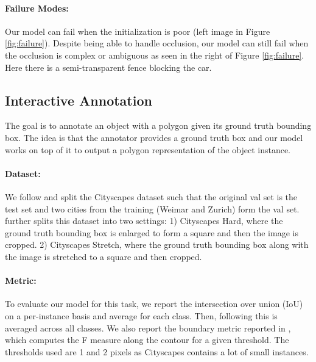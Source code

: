 \documentclass[10pt,twocolumn,letterpaper]{article}
\begin{document}
\paragraph{Failure Modes:} 
Our model can  fail when the initialization is poor (left image in Figure \ref{fig:failure}). Despite being able to handle occlusion, our model can still fail when the occlusion is complex or ambiguous as seen in the right of Figure \ref{fig:failure}. Here there is a semi-transparent fence blocking the car.


\subsection{Interactive Annotation} \label{ssec:annot}
The goal is to annotate an object with a polygon given its ground truth bounding box. The idea is that the annotator provides a ground truth box and our model works on top of it to output a polygon representation of the object instance.

\vspace{-.4mm}

\paragraph{Dataset:}
We follow \cite{polygon-rnn} and split the Cityscapes dataset such that the original val set is the test set and two cities from the training (Weimar and Zurich) form the val set. \cite{wang2019delse} further splits this dataset into two settings: 1) Cityscapes Hard, where the ground truth bounding box is enlarged to form a square and then the image is cropped. 2) Cityscapes Stretch, where the ground truth bounding box along with the image is stretched to a square and then cropped.

\vspace{-.4mm}

\paragraph{Metric:}
To evaluate our model for this task, we report the intersection over union (IoU) on a per-instance basis and average for each class. Then, following \cite{polygon-rnn} this is averaged across all classes. We also report the  boundary metric reported in \cite{wang2019delse, Perazzi2016}, which computes the F measure along the contour for a given threshold. The thresholds used are 1 and 2 pixels as Cityscapes contains a lot of small instances.
\end{document}
